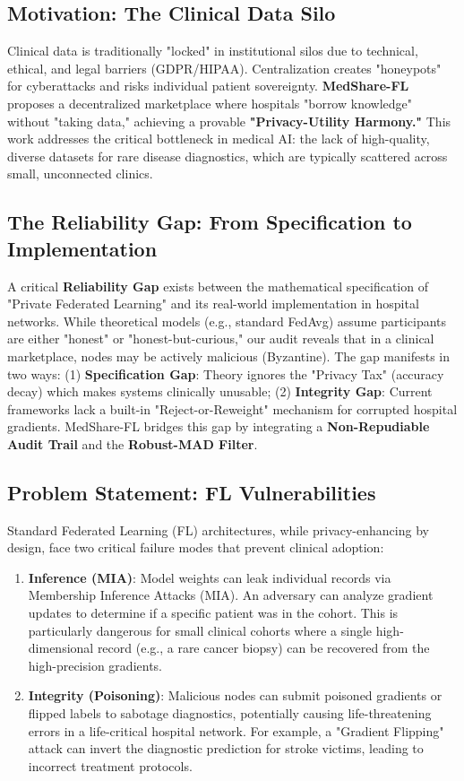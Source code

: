 \documentclass[10pt, a4paper, twocolumn]{article}
\begin{document}
\subsection{Motivation: The Clinical Data Silo}
Clinical data is traditionally "locked" in institutional silos due to technical, ethical, and legal barriers (GDPR/HIPAA). Centralization creates "honeypots" for cyberattacks and risks individual patient sovereignty. \textbf{MedShare-FL} proposes a decentralized marketplace where hospitals "borrow knowledge" without "taking data," achieving a provable \textbf{"Privacy-Utility Harmony."} This work addresses the critical bottleneck in medical AI: the lack of high-quality, diverse datasets for rare disease diagnostics, which are typically scattered across small, unconnected clinics.

\subsection{The Reliability Gap: From Specification to Implementation}
A critical \textbf{Reliability Gap} exists between the mathematical specification of "Private Federated Learning" and its real-world implementation in hospital networks. While theoretical models (e.g., standard FedAvg) assume participants are either "honest" or "honest-but-curious," our audit reveals that in a clinical marketplace, nodes may be actively malicious (Byzantine). The gap manifests in two ways: (1) \textbf{Specification Gap}: Theory ignores the "Privacy Tax" (accuracy decay) which makes systems clinically unusable; (2) \textbf{Integrity Gap}: Current frameworks lack a built-in "Reject-or-Reweight" mechanism for corrupted hospital gradients. MedShare-FL bridges this gap by integrating a \textbf{Non-Repudiable Audit Trail} and the \textbf{Robust-MAD Filter}.

\subsection{Problem Statement: FL Vulnerabilities}
Standard Federated Learning (FL) architectures, while privacy-enhancing by design, face two critical failure modes that prevent clinical adoption:
\begin{enumerate}
    \item \textbf{Inference (MIA)}: Model weights can leak individual records via Membership Inference Attacks (MIA). An adversary can analyze gradient updates to determine if a specific patient was in the cohort. This is particularly dangerous for small clinical cohorts where a single high-dimensional record (e.g., a rare cancer biopsy) can be recovered from the high-precision gradients.
    \item \textbf{Integrity (Poisoning)}: Malicious nodes can submit poisoned gradients or flipped labels to sabotage diagnostics, potentially causing life-threatening errors in a life-critical hospital network. For example, a "Gradient Flipping" attack can invert the diagnostic prediction for stroke victims, leading to incorrect treatment protocols.
\end{enumerate}
\end{document}
